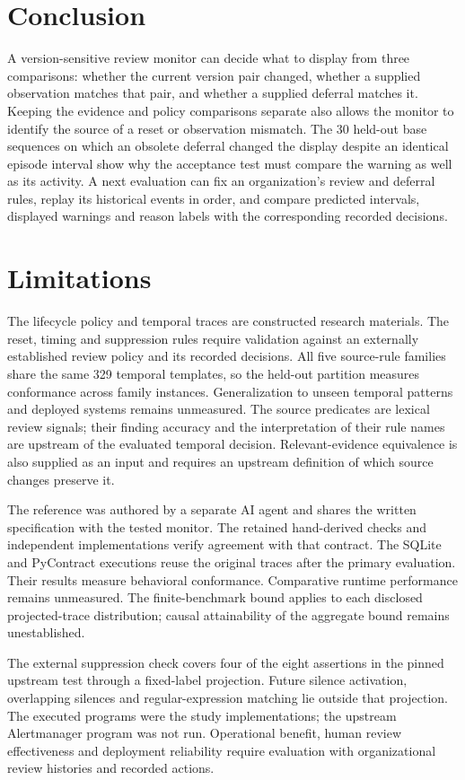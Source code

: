 \documentclass[preprint,11pt]{elsarticle}
\begin{document}
\section{Conclusion}
A version-sensitive review monitor can decide what to display from three comparisons: whether the current version pair changed, whether a supplied observation matches that pair, and whether a supplied deferral matches it. Keeping the evidence and policy comparisons separate also allows the monitor to identify the source of a reset or observation mismatch. The 30 held-out base sequences on which an obsolete deferral changed the display despite an identical episode interval show why the acceptance test must compare the warning as well as its activity. A next evaluation can fix an organization's review and deferral rules, replay its historical events in order, and compare predicted intervals, displayed warnings and reason labels with the corresponding recorded decisions.

\section{Limitations}
The lifecycle policy and temporal traces are constructed research materials. The reset, timing and suppression rules require validation against an externally established review policy and its recorded decisions. All five source-rule families share the same 329 temporal templates, so the held-out partition measures conformance across family instances. Generalization to unseen temporal patterns and deployed systems remains unmeasured. The source predicates are lexical review signals; their finding accuracy and the interpretation of their rule names are upstream of the evaluated temporal decision. Relevant-evidence equivalence is also supplied as an input and requires an upstream definition of which source changes preserve it.

The reference was authored by a separate AI agent and shares the written specification with the tested monitor. The retained hand-derived checks and independent implementations verify agreement with that contract. The SQLite and PyContract executions reuse the original traces after the primary evaluation. Their results measure behavioral conformance. Comparative runtime performance remains unmeasured. The finite-benchmark bound applies to each disclosed projected-trace distribution; causal attainability of the aggregate bound remains unestablished.

The external suppression check covers four of the eight assertions in the pinned upstream test through a fixed-label projection. Future silence activation, overlapping silences and regular-expression matching lie outside that projection. The executed programs were the study implementations; the upstream Alertmanager program was not run. Operational benefit, human review effectiveness and deployment reliability require evaluation with organizational review histories and recorded actions.
\end{document}
